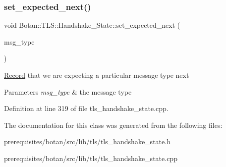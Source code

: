 \mbox{\label{class_botan_1_1_t_l_s_1_1_handshake___state_a22101cce723f09aaa6b0bfa8ff526f7a}} 
\subsubsection{\texorpdfstring{set\+\_\+expected\+\_\+next()}{set\_expected\_next()}}
{\footnotesize\ttfamily void Botan\+::\+T\+L\+S\+::\+Handshake\+\_\+\+State\+::set\+\_\+expected\+\_\+next (\begin{DoxyParamCaption}\item[{Handshake\+\_\+\+Type}]{msg\+\_\+type }\end{DoxyParamCaption})}

\mbox{\hyperlink{class_botan_1_1_t_l_s_1_1_record}{Record}} that we are expecting a particular message type next 
\begin{DoxyParams}{Parameters}
{\em msg\+\_\+type} & the message type \\
\hline
\end{DoxyParams}


Definition at line 319 of file tls\+\_\+handshake\+\_\+state.\+cpp.



The documentation for this class was generated from the following files\+:\begin{DoxyCompactItemize}
\item 
prerequisites/botan/src/lib/tls/tls\+\_\+handshake\+\_\+state.\+h\item 
prerequisites/botan/src/lib/tls/tls\+\_\+handshake\+\_\+state.\+cpp\end{DoxyCompactItemize}

